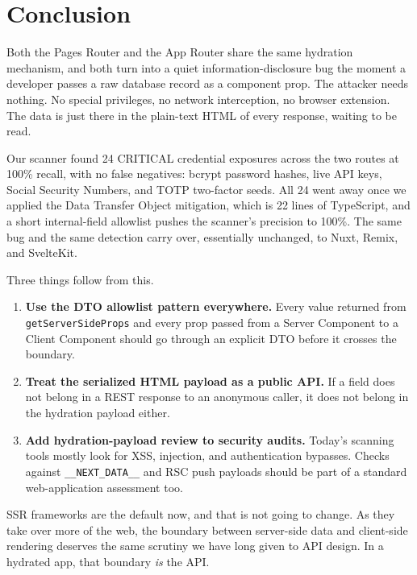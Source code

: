 \documentclass[runningheads]{llncs}
\begin{document}
\section{Conclusion}
\label{sec:conclusion}

Both the Pages Router and the App Router share the same hydration
mechanism, and both turn into a quiet information-disclosure bug the moment
a developer passes a raw database record as a component prop.  The
attacker needs nothing.  No special privileges, no network interception,
no browser extension.  The data is just there in the plain-text HTML of
every response, waiting to be read.

Our scanner found 24 CRITICAL credential exposures across the two routes
at 100\% recall, with no false negatives: bcrypt password hashes, live API
keys, Social Security Numbers, and TOTP two-factor seeds.  All 24 went
away once we applied the Data Transfer Object mitigation, which is 22 lines
of TypeScript, and a short internal-field allowlist pushes the scanner's
precision to 100\%.  The same bug and the same detection carry over,
essentially unchanged, to Nuxt, Remix, and SvelteKit.

Three things follow from this.

\begin{enumerate}
  \item \textbf{Use the DTO allowlist pattern everywhere.} Every value
        returned from \texttt{getServerSideProps} and every prop passed
        from a Server Component to a Client Component should go through an
        explicit DTO before it crosses the boundary.

  \item \textbf{Treat the serialized HTML payload as a public API.} If a
        field does not belong in a REST response to an anonymous caller,
        it does not belong in the hydration payload either.

  \item \textbf{Add hydration-payload review to security audits.} Today's
        scanning tools mostly look for XSS, injection, and authentication
        bypasses.  Checks against \texttt{\_\_NEXT\_DATA\_\_} and RSC push
        payloads should be part of a standard web-application assessment
        too.
\end{enumerate}

SSR frameworks are the default now, and that is not going to change.  As
they take over more of the web, the boundary between server-side data and
client-side rendering deserves the same scrutiny we have long given to API
design.  In a hydrated app, that boundary \emph{is} the API.
\end{document}
